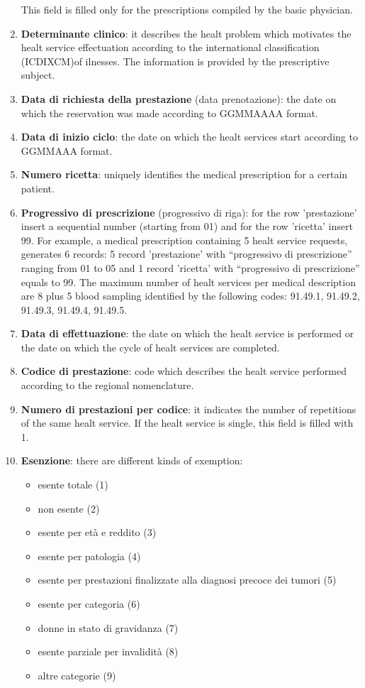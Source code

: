 \documentclass[paper=a4, fontsize=11pt]{scrartcl} %
\numberwithin{equation}{section} %
\numberwithin{figure}{section} %
\numberwithin{table}{section} %
\begin{document}
\begin{enumerate}
\begin{itemize}
\end{itemize}
This field is filled only for the prescriptions compiled by the basic physician.
\item \textbf{Determinante clinico}: it describes the healt problem which motivates the healt service effectuation according to the international classification (ICDIXCM)of ilnesses. The information is provided by the prescriptive subject.
\item \textbf{Data di richiesta della prestazione} (data prenotazione): the date on which the reservation was made according to GGMMAAAA format.
\item \textbf{Data di inizio ciclo}: the date on which the healt services start according to GGMMAAA format.
\item \textbf{Numero ricetta}: uniquely identifies the medical prescription for a certain patient.
\item \textbf{Progressivo di prescrizione} (progressivo di riga): for the row 'prestazione' insert a sequential number (starting from 01) and for the row 'ricetta' insert 99. For example, a medical prescription containing 5 healt service requests, generates 6 records: 5 record 'prestazione' with ``progressivo di prescrizione'' ranging from 01 to 05 and 1 record 'ricetta' with ``progressivo di prescrizione'' equals to 99. The maximum number of healt services per medical description are 8 plus 5 blood sampling identified by the following codes: 91.49.1, 91.49.2, 91.49.3, 91.49.4, 91.49.5.
\item \textbf{Data di effettuazione}: the date on which the healt service is performed or the date on which the cycle of healt services are completed.
\item \textbf{Codice di prestazione}: code which describes the healt service performed according to the regional nomenclature.
\item \textbf{Numero di prestazioni per codice}: it indicates the number of repetitions of the same healt service. If the healt service is single, this field is filled with 1.
\item \textbf{Esenzione}: there are different kinds of exemption:
\begin{itemize}
\item esente totale (1)
\item non esente (2)
\item esente per età e reddito (3)
\item esente per patologia (4)
\item esente per prestazioni finalizzate alla diagnosi precoce dei tumori (5)
\item esente per categoria (6)
\item donne in stato di gravidanza (7)
\item esente parziale per invalidità (8)
\item altre categorie (9)


\end{itemize}
\end{enumerate}
\end{document}
